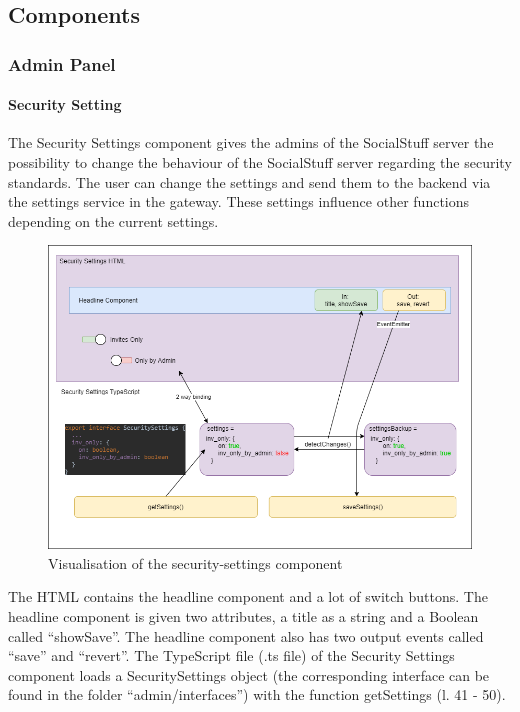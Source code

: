 \subsection{Components}

\subsubsection{Admin Panel}

\paragraph{Security Setting}
The Security Settings component gives the admins of the SocialStuff server the possibility to change the behaviour of the SocialStuff server
regarding the security standards. The user can change the settings and send them to the backend via the settings service in the gateway.
These settings influence other functions depending on the current settings.
\begin{figure}[h]
    \centering
    \includegraphics[width=1.0\textwidth]{./images/security_settings}
    \caption{Visualisation of the security-settings component}
    \label{fig:secset}
\end{figure}
The HTML contains the headline component and a lot of switch buttons. The headline component is given two attributes,
a title as a string and a Boolean called \enquote{showSave}. The headline component also has two output events called \enquote{save} and \enquote{revert}.
The TypeScript file (.ts file) of the Security Settings component loads a SecuritySettings object (the corresponding interface can be found in the folder \enquote{admin/interfaces}) with the function getSettings (l. 41 - 50).
